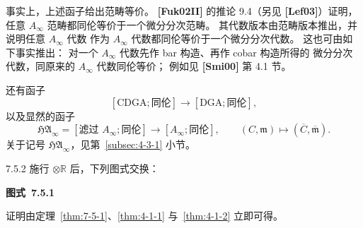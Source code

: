 事实上，上述函子给出范畴等价。
\textbf{[Fuk02II]} 的推论 9.4（另见 \textbf{[Lef03]}）证明，
任意 $A_\infty$ 范畴都同伦等价于一个微分分次范畴。
其代数版本由范畴版本推出，并说明任意 $A_\infty$ 代数
作为 $A_\infty$ 代数都同伦等价于一个微分分次代数。
这也可由如下事实推出：
对一个 $A_\infty$ 代数先作 bar 构造、再作 cobar 构造所得的
微分分次代数，同原来的 $A_\infty$ 代数同伦等价；
例如见 \textbf{[Smi00]} 第 4.1 节。

还有函子
\[
[\mathrm{CDGA};\text{同伦}]
\longrightarrow
[\mathrm{DGA};\text{同伦}],
\]
以及显然的函子
\[
\mathfrak{HA}_\infty
=
[\text{滤过 }A_\infty;\text{同伦}]
\longrightarrow
[A_\infty;\text{同伦}],
\qquad
(C,\mathfrak m)
\longmapsto
(\overline C,\overline{\mathfrak m}).
\]
关于记号 $\mathfrak{HA}_\infty$，见第~\ref{subsec:4-3-1} 小节。

\begin{corollary}{7.5.2}\label{cor:7-5-2}
施行 $\otimes\mathbb R$ 后，下列图式交换：

\par\smallskip\noindent\begin{minipage}{\textwidth}
\centering
{}
\par\smallskip
{\renewcommand{\thefigure}{7.5.1}
\normalfont\bfseries 图式~\thefigure\label{diag:7-5-1}}
\end{minipage}\par\smallskip
\end{corollary}

证明由定理~\ref{thm:7-5-1}、\ref{thm:4-1-1}
与~\ref{thm:4-1-2} 立即可得。
